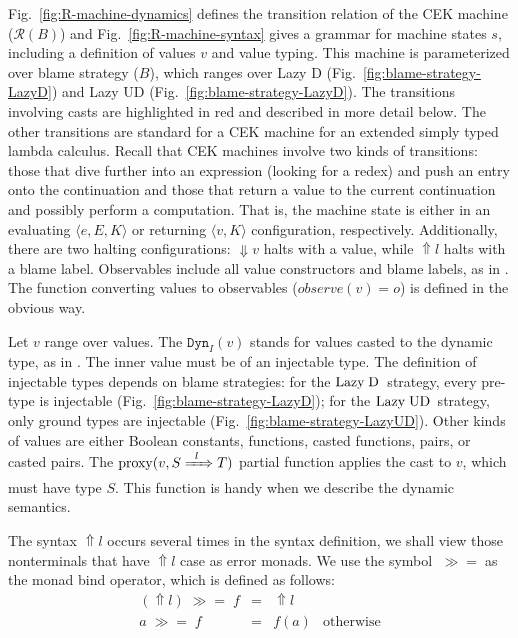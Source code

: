 \documentclass[runningheads]{llncs}
\newcommand{\LUD}{\ensuremath{\text{Lazy\;UD}}}
\newcommand{\LD}{\ensuremath{\text{Lazy\;D}}}
\newcommand{\RMachine}[1]{\ensuremath{\mathcal{R}(#1)}}
\newcommand{\error}[1]{\ensuremath{\Uparrow#1}}
\newcommand{\Pbool}[0]{\ensuremath{\mathtt{Bool}}}
\newcommand{\etrue}[0]{\mathtt{true}}
\newcommand{\ecast}[2]{\ensuremath{#1 : #2}}
\newcommand{\ccast}[3]{#1 \xRightarrow[]{\enskip #2 \enskip} #3}
\newcommand{\vdyn}[2]{\mathtt{Dyn}_{#1}(#2)}
\newcommand{\sexpr}[3]{\ensuremath{\langle#1,#2,#3\rangle}}
\newcommand{\scont}[2]{\ensuremath{\langle#1,#2\rangle}}
\newcommand{\shalt}[1]{\ensuremath{\Downarrow #1}}
\newcommand{\mbind}[0]{\ensuremath{\;\gg=\;}}
\newcommand{\proxy}[2]{\ensuremath{\mathrm{proxy}(#1,#2)}}
\begin{document}
Fig.~\ref{fig:R-machine-dynamics} defines the transition relation of the CEK
machine (\RMachine{B}) and Fig.~\ref{fig:R-machine-syntax} gives a grammar for machine 
states $s$, including a definition of values $v$ and value typing.
%
This machine is parameterized over blame strategy ($B$), which ranges over
Lazy D (Fig.~\ref{fig:blame-strategy-LazyD}) and Lazy UD 
(Fig.~\ref{fig:blame-strategy-LazyD}).
%
The transitions involving casts are highlighted in red and described in
more detail below. The other transitions are standard for a CEK
machine for an extended simply typed lambda calculus.
%
Recall that CEK machines involve two kinds of transitions: those
that dive further into an expression (looking for a redex) and push an
entry onto the continuation and those that return a value to the
current continuation and possibly perform a computation.
That is, the machine state is either in an evaluating
$\sexpr{e}{E}{K}$ or returning $\scont{v}{K}$ configuration, 
respectively. Additionally, there are two halting configurations: \shalt{v} 
halts with a value, while \error{l} halts with a blame label. 
Observables include all value constructors and blame labels, as in 
\citep{siek2012interpretations}. 
The function converting values to observables ($observe(v) = o$) is defined in 
the obvious way.

Let $v$ range over values. The 
$\vdyn{I}{v}$ stands for values casted to the dynamic type, as in 
\citep{wadler2009well}. The inner value must be of an 
injectable type. The definition of injectable types depends on blame 
strategies:
%
for the \LD\ strategy, every pre-type is injectable 
(Fig.~\ref{fig:blame-strategy-LazyD});
%
for the \LUD\ strategy, only ground types are injectable 
(Fig.~\ref{fig:blame-strategy-LazyUD}).
%
Other kinds of values are either Boolean constants, functions, casted 
functions, pairs, or casted pairs.
%
The \proxy{v}{\ccast{S}{l}{T}} partial function applies the cast to $v$, which must
have type $S$. This function is handy when we describe the dynamic semantics.

The syntax \error{l} occurs several times in the syntax definition, we shall 
view those nonterminals that have \error{l} case as error monads. We use 
the symbol \mbind as the monad bind operator, which is defined as follows:
\[
\begin{array}{rcll}
(\error{l}) \mbind f & = & \error{l} \\
          a \mbind f & = & f(a)      & \text{otherwise}
\end{array}
\]
\end{document}
